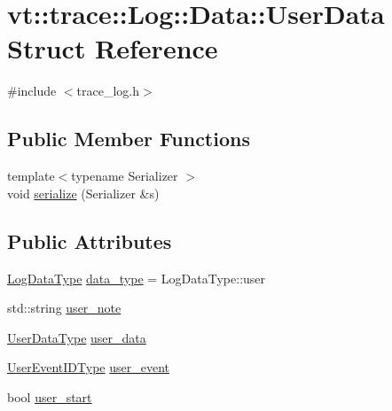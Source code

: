 \hypertarget{structvt_1_1trace_1_1_log_1_1_data_1_1_user_data}{}\section{vt\+:\+:trace\+:\+:Log\+:\+:Data\+:\+:User\+Data Struct Reference}
\label{structvt_1_1trace_1_1_log_1_1_data_1_1_user_data}


{\ttfamily \#include $<$trace\+\_\+log.\+h$>$}

\subsection*{Public Member Functions}
\begin{DoxyCompactItemize}
\item 
{\footnotesize template$<$typename Serializer $>$ }\\void \hyperlink{structvt_1_1trace_1_1_log_1_1_data_1_1_user_data_a1d5e2988e8c94a26a220c057337a4048}{serialize} (Serializer \&s)
\end{DoxyCompactItemize}
\subsection*{Public Attributes}
\begin{DoxyCompactItemize}
\item 
\hyperlink{structvt_1_1trace_1_1_log_ae1c08093fd18967b7d4912d04d6acc3d}{Log\+Data\+Type} \hyperlink{structvt_1_1trace_1_1_log_1_1_data_1_1_user_data_a74f45e93662407f9b432a640807472c9}{data\+\_\+type} = Log\+Data\+Type\+::user
\item 
std\+::string \hyperlink{structvt_1_1trace_1_1_log_1_1_data_1_1_user_data_a14f69beb263080bf4fd0872fafcf4b6c}{user\+\_\+note}
\item 
\hyperlink{structvt_1_1trace_1_1_log_af392c3825bf45d286a0f77bddf7a96cf}{User\+Data\+Type} \hyperlink{structvt_1_1trace_1_1_log_1_1_data_1_1_user_data_ade431a285a79e18cfe816f03d1ae7285}{user\+\_\+data}
\item 
\hyperlink{namespacevt_1_1trace_a5908920d051c144c89f17c69ed262350}{User\+Event\+I\+D\+Type} \hyperlink{structvt_1_1trace_1_1_log_1_1_data_1_1_user_data_a00002c986ccb5d7e267eecfad00941fc}{user\+\_\+event}
\item 
bool \hyperlink{structvt_1_1trace_1_1_log_1_1_data_1_1_user_data_a99efa647964217841ba1862f07b00868}{user\+\_\+start}
\end{DoxyCompactItemize}

